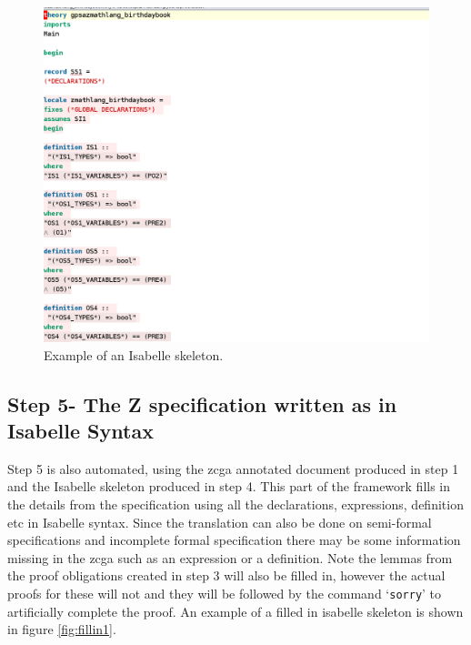 \begin{figure}[H]
 \begin{center}
 \includegraphics [scale=0.2]{Figures/Design/isaskeleton.png}
 \caption{Example of an Isabelle skeleton.}
 \label{fig:isaskelexample}
\end{center}
\end{figure} 

\subsection{Step 5- The Z specification written as in Isabelle Syntax}

Step 5 is also automated, using the \gls{zcga} annotated document produced in
step 1 and the Isabelle skeleton produced in step 4. This part of the framework
fills in the details from the specification using all the declarations,
expressions, definition etc in Isabelle syntax. Since the translation can also
be done on semi-formal specifications and incomplete formal specification there
may be some information missing in the \gls{zcga} such as an expression or a
definition. Note the lemmas from the proof obligations created in step 3 will
also be filled in, however the actual proofs for these will not and they will be
followed by the command `\texttt{sorry}' to artificially complete the proof. An
example of a filled in isabelle skeleton is shown in figure \ref{fig:fillin1}.

